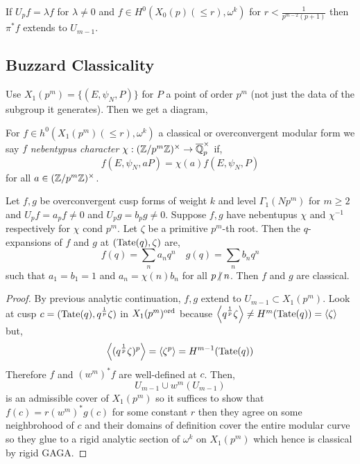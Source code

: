 \documentclass[12pt]{article}
\begin{document}
\begin{cor}
If $U_p f = \lambda f$ for $\lambda \neq 0$ and $f \in H^0(X_0(p)(\le r), \omega^k)$ for $r < \frac{1}{p^{m-2} (p+1)}$ then $\pi^*f$ extends to $U_{m-1}$.
\end{cor}

\subsection{Buzzard Classicality}

Use $X_1(p^m) = \{ (E, \psi_N, P) \}$ for $P$ a point of order $p^m$ (not just the data of the subgroup it generates). Then we get a diagram,
\begin{center}
\end{center}

\begin{defn}
For $f \in h^0(X_1(p^m)(\le r), \omega^k)$ a classical or overconvergent modular form we say $f$ \textit{nebentypus character} $\chi : (\mathbb{Z} / p^m \mathbb{Z})^\times \to \overline{\mathbb{Q}}_p^\times$ if,
\[ f(E, \psi_N, aP) = \chi(a) f(E, \psi_N, P) \]
for all $a \in (\mathbb{Z} / p^m \mathbb{Z})^\times$. 
\end{defn}

\begin{thm}
Let $f,g$ be overconvergent cusp forms of weight $k$ and level $\Gamma_1(N p^m)$ for $m \ge 2$ and $U_p f = a_p f \neq 0$ and $U_p g = b_p g \neq 0$. Suppose $f, g$ have nebentupus $\chi$ and $\chi^{-1}$ respectively for $\chi$ cond $p^m$. Let $\zeta$ be a primitive $p^m$-th root. Then the $q$-expansions of $f$ and $g$ at $(\mathrm{Tate}(q), \zeta)$ are,
\[ f(q) = \sum_n a_n q^n \quad g(q) = \sum_n b_n q^n \]
such that $a_1 = b_1 = 1$ and $a_n = \chi(n) b_n$ for all $p \ndivides n$. Then $f$ and $g$ are classical. 
\end{thm}

\begin{proof}
By previous analytic continuation, $f,g$ extend to $U_{m-1} \subset X_1(p^m)$. Look at cusp $c = (\mathrm{Tate}(q), q^{\frac{1}{p}} \zeta)$ in $X_1(p^m)^{\operatorname{\mathrm{ord}}}$ because $\left< q^{\frac{1}{p}} \zeta \right> \neq H^m(\mathrm{Tate}(q)) = \left< \zeta \right>$ but,
\[ \left< (q^{\frac{1}{p}} \zeta)^p \right> = \left< \zeta^p \right> = H^{m-1}(\mathrm{Tate}(q)) \]
Therefore $f$ and $(w^m)^* f$ are well-defined at $c$. Then,
\[ U_{m-1} \cup w^m(U_{m-1}) \]
is an admissible cover of $X_1(p^m)$ so it suffices to show that $f(c) = r (w^m)^* g(c)$ for some constant $r$ then they agree on some neighbrohood of $c$ and their domains of definition cover the entire modular curve so they glue to a rigid analytic section of $\omega^k$ on $X_1(p^m)$ which hence is classical by rigid GAGA. 
\end{proof}
\end{document}
